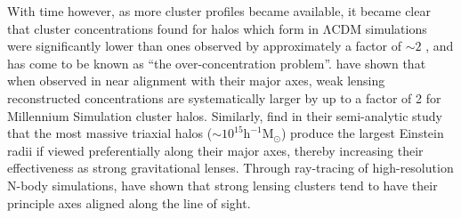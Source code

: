 With time however, as more cluster profiles became available, it became clear that cluster concentrations found for halos which form in $\mathrm{\Lambda CDM}$ simulations were significantly lower than ones observed by approximately a factor of $\mathrm{\sim 2}$ \citep{CN2007,BroadhurstEtAl2008,OguriEtAl2009}, and has come to be known as ``the over-concentration problem''.  \citet{BaheEtAl2012} have shown that when observed in near alignment with their major axes, weak lensing reconstructed concentrations are systematically larger by up to a factor of 2 for Millennium Simulation cluster halos. Similarly, \citet{OguriBlandford2009} find in their semi-analytic study that the most massive triaxial halos ($\sim 10^{15} \mathrm{h}^{-1 } \mathrm{M}_{\odot}$) produce the largest Einstein radii if viewed preferentially along their major axes, thereby increasing their effectiveness as strong gravitational lenses. Through ray-tracing of high-resolution N-body simulations, \citet{HennawiEtAl2007} have shown that strong lensing clusters tend to have their principle axes aligned along the line of sight.

